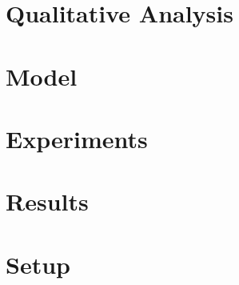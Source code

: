 \documentclass[11pt]{article}
\begin{document}
\appendix
\label{sec:appendix}
\section{Qualitative Analysis}

\section{Model}


\section{Experiments}

\section{Results}

\section{Setup}
\end{document}
